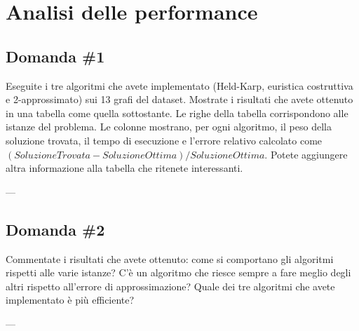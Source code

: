 \section{Analisi delle performance}
\label{cap:performance-analysis}

\subsection{Domanda \#1}

\begin{displayquote}
Eseguite i tre algoritmi che avete implementato (Held-Karp, euristica costruttiva e 2-approssimato) sui 13 grafi del dataset. Mostrate i risultati che avete ottenuto in una tabella come quella sottostante. Le righe della tabella corrispondono alle istanze del problema. Le colonne mostrano, per ogni algoritmo, il peso della soluzione trovata, il tempo di esecuzione e l'errore relativo calcolato come $(SoluzioneTrovata-SoluzioneOttima)/SoluzioneOttima$. Potete aggiungere altra informazione alla tabella che ritenete interessanti.
\end{displayquote}

\noindent --- \\


\subsection{Domanda \#2}

\begin{displayquote}
Commentate i risultati che avete ottenuto: come si comportano gli algoritmi rispetti alle varie istanze? C'è un algoritmo che riesce sempre a fare meglio degli altri rispetto all'errore di approssimazione? Quale dei tre algoritmi che avete implementato è più efficiente?
\end{displayquote}


\noindent ---\\
